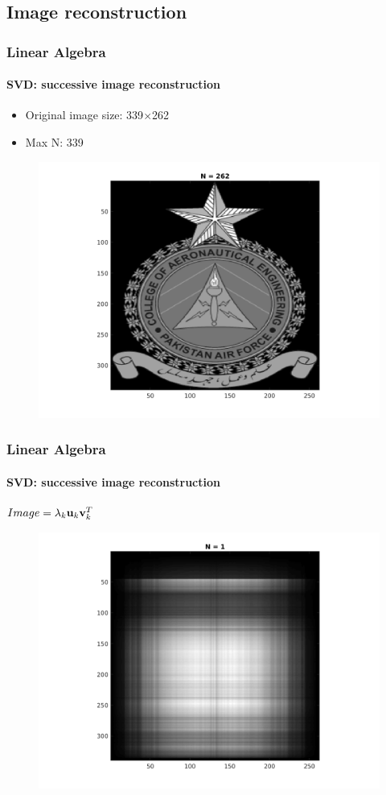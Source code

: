 \documentclass[hyperref={pdfpagelabels=true}]{beamer}
\begin{document}
\subsection{Image reconstruction}

\begin{frame}
\frametitle{Linear Algebra}
\framesubtitle{SVD: successive image reconstruction } 
\scriptsize{
\begin{itemize}
\item Original image size: 339$\times$262
\item Max N: 339
\end{itemize}}
\begin{figure}[!htb]
\centering
\includegraphics [scale=0.48]{figs/b262.png}
\end{figure}
\end{frame}

\begin{frame}
\frametitle{Linear Algebra}
\framesubtitle{SVD: successive image reconstruction} 
\small{
\begin{center}
$Image = \lambda_k{\bf u}_k {\bf v}_k^T$
\end{center}}
\begin{figure}[!htb]
\centering
\includegraphics [scale=0.48]{n/b1.png}
\end{figure}
\end{frame}
\end{document}
